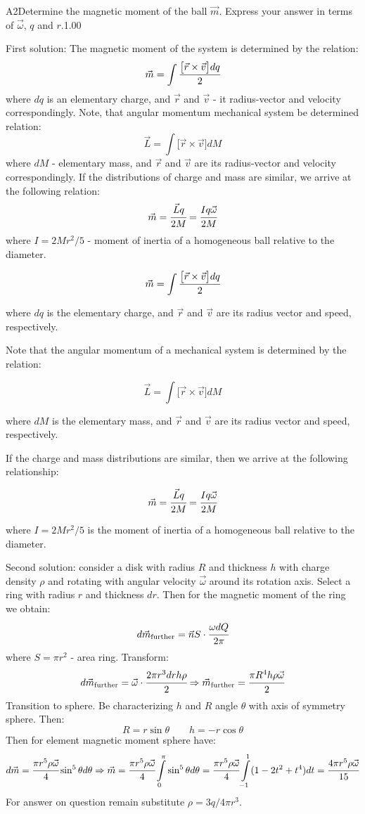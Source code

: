 \documentclass[11pt,a4paper]{article}
\begin{document}
\begin{solcard}{A2}{Determine the magnetic moment of the ball $\vec{m}$. Express your answer in terms of $\vec{\omega}$, $q$ and $r$.}{1.00}

First solution: The magnetic moment of the system is determined by the relation: $$\vec{m}=\int \cfrac{\bigl[\vec{r}\times\vec{v}\bigr]dq}{2} $$ where $dq$ is an elementary charge, and $\vec{r}$ and $\vec{v}$ - it radius-vector and velocity correspondingly. Note, that angular momentum mechanical system be determined relation: $$\vec{L}=\int \bigl[\vec{r}\times\vec{v}\bigr] dM $$ where $dM $ - elementary mass, and $\vec{r}$ and $\vec{v}$ are its radius-vector and velocity correspondingly. If the distributions of charge and mass are similar, we arrive at the following relation: $$\vec{m}=\cfrac{\vec{L}q}{2M}=\cfrac{Iq\vec{\omega}}{2M} $$ where $I=2Mr^2/5$ - moment of inertia of a homogeneous ball relative to the diameter.


$$\vec{m}=\int \cfrac{\bigl[\vec{r}\times\vec{v}\bigr]dq}{2} $$


where $dq$ is the elementary charge, and $\vec{r}$ and $\vec{v}$ are its radius vector and speed, respectively.


Note that the angular momentum of a mechanical system is determined by the relation:


$$\vec{L}=\int \bigl[\vec{r}\times\vec{v}\bigr] dM $$


where $dM$ is the elementary mass, and $\vec{r}$ and $\vec{v}$ are its radius vector and speed, respectively.


If the charge and mass distributions are similar, then we arrive at the following relationship:


$$\vec{m}=\cfrac{\vec{L}q}{2M}=\cfrac{Iq\vec{\omega}}{2M} $$


where $I=2Mr^2/5$ is the moment of inertia of a homogeneous ball relative to the diameter.


Second solution: consider a disk with radius $R$ and thickness $h$ with charge density $\rho$ and rotating with angular velocity $\vec{\omega}$ around its rotation axis. Select a ring with radius $r$ and thickness $dr$. Then for the magnetic moment of the ring we obtain: $$d\vec{m}_\text{further}=\vec{n}S\cdot\cfrac{\omega dQ}{2\pi} $$ where $S=\pi{r}^2$ - area ring. Transform: $$d\vec{m}_{\text{further}}=\vec{\omega}\cdot\cfrac{2\pi{r}^3drh\rho}{2}\Rightarrow{\vec{m}_\text{further}=\cfrac{\pi{R}^4h\rho\vec{\omega}}{2}} $$ Transition to sphere. Be characterizing $h$ and $R$ angle $\theta$ with axis of symmetry sphere. Then: $$R=r\sin\theta\qquad h=-r\cos\theta $$ Then for element magnetic moment sphere have: $$d\vec{m}=\cfrac{\pi{r}^5\rho\vec{\omega}}{4}\sin^5\theta d\theta\Rightarrow{\vec{m}=\cfrac{\pi{r}^5\rho\vec{\omega}}{4}\int\limits_0^{\pi}\sin^5\theta d\theta}=\cfrac{\pi{r}^5\rho\vec{\omega}}{4}\int\limits_{-1}^{1}(1-2t^2+t^4)dt=\cfrac{4\pi{r}^5\rho\vec{\omega}}{15} $$ For answer on question remain substitute $\rho=3q/4\pi{r}^3$.



\end{solcard}
\end{document}
